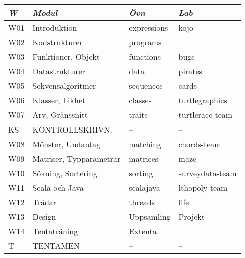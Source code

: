 \begin{tabular}{l|l|l|l}
\textit{W} & \textit{Modul} & \textit{Övn} & \textit{Lab} \\ \hline \hline
W01 & Introduktion            & expressions & kojo            \\
W02 & Kodstrukturer           & programs    & --              \\
W03 & Funktioner, Objekt      & functions   & bugs            \\
W04 & Datastrukturer          & data        & pirates         \\
W05 & Sekvensalgoritmer       & sequences   & cards           \\
W06 & Klasser, Likhet         & classes     & turtlegraphics  \\
W07 & Arv, Gränssnitt         & traits      & turtlerace-team \\
KS  & KONTROLLSKRIVN.         & --          & --              \\
W08 & Mönster, Undantag       & matching    & chords-team     \\
W09 & Matriser, Typparametrar & matrices    & maze            \\
W10 & Sökning, Sortering      & sorting     & surveydata-team \\
W11 & Scala och Java          & scalajava   & lthopoly-team   \\
W12 & Trådar                  & threads     & life            \\
W13 & Design                  & Uppsamling  & Projekt         \\
W14 & Tentaträning            & Extenta     & --              \\
T   & TENTAMEN                & --          & --              \\
\end{tabular}
